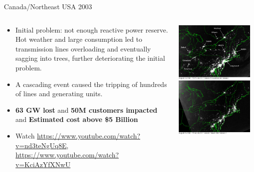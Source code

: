 \begin{frame}{Canada/Northeast USA 2003}
\begin{columns}
\begin{column}{0.6\textwidth}
    \begin{itemize}
        \item Initial problem: not enough reactive power reserve. Hot weather and large consumption led to transmission lines overloading and eventually sagging into trees, further deteriorating the initial problem.
        \item A cascading event caused the tripping of hundreds of lines and generating units.
        \item \textbf{63 GW lost} and \textbf{50M customers impacted} and \textbf{Estimated cost above \$5 Billion}
        \item Watch \tiny{\url{https://www.youtube.com/watch?v=nd3teNgUq8E}, \url{https://www.youtube.com/watch?v=KciAzYfXNwU}}
    \end{itemize}
\end{column}
\begin{column}{0.4\textwidth}
    \begin{center}
    \includegraphics[width=0.6\linewidth]{images/USABlackOut.png}
    \end{center}
\end{column}
\end{columns}


\end{frame}

